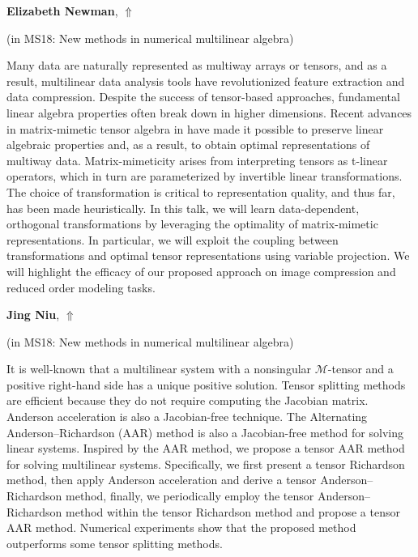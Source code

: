 \documentclass[ILAS2025-program.tex]{subfiles}
\begin{document}
     \hypertarget{down0039}{}\begin{ilasabstract}
    
    \textbf{Elizabeth Newman},  \hfill \hyperlink{up0039}{$\Uparrow$}
    
    (in {\color{mstitle}MS18: New methods in numerical multilinear algebra})
        
        \mtskip
    Many data are naturally represented as multiway arrays or tensors, and as a result, multilinear data analysis tools have revolutionized feature extraction and data compression. Despite the success of tensor-based approaches, fundamental linear algebra properties often break down in higher dimensions. Recent advances in matrix-mimetic tensor algebra in have made it possible to preserve linear algebraic properties and, as a result, to obtain optimal representations of multiway data. Matrix-mimeticity arises from interpreting tensors as t-linear operators, which in turn are parameterized by invertible linear transformations. The choice of transformation is critical to representation quality, and thus far, has been made heuristically. In this talk, we will learn data-dependent, orthogonal transformations by leveraging the optimality of matrix-mimetic representations. In particular, we will exploit the coupling between transformations and optimal tensor representations using variable projection. We will highlight the efficacy of our proposed approach on image compression and reduced order modeling tasks.
\end{ilasabstract}
     \hypertarget{down0148}{}\begin{ilasabstract}
    
    \textbf{Jing Niu},  \hfill \hyperlink{up0148}{$\Uparrow$}
    
    (in {\color{mstitle}MS18: New methods in numerical multilinear algebra})
        
        \mtskip
    It is well-known that a multilinear system with a nonsingular $ \mathcal{M} $-tensor and a positive right-hand side has a unique positive solution.
Tensor splitting methods are efficient because they do not require computing the Jacobian matrix.
Anderson acceleration is also a Jacobian-free technique. 
The Alternating Anderson--Richardson (AAR) method is also a Jacobian-free method for solving linear systems.
Inspired by the AAR method,
we propose a tensor AAR method for solving multilinear systems.
Specifically, we first present a tensor Richardson method, then apply Anderson acceleration and derive a tensor Anderson--Richardson method, finally, we periodically employ the tensor Anderson--Richardson method within the tensor Richardson method and propose a tensor AAR method.
Numerical experiments show that the proposed method outperforms some tensor splitting methods.
\end{ilasabstract}
\end{document}
